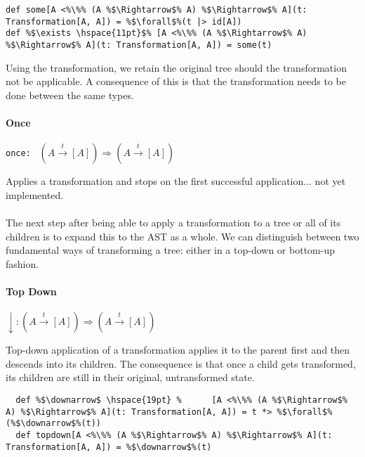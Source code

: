 \documentclass[10pt,a4paper,oneside]{scrreprt}
\begin{document}
\begin{lstlisting}
def some[A <%\%% (A %$\Rightarrow$% A) %$\Rightarrow$% A](t: Transformation[A, A]) = %$\forall$%(t |> id[A])
def %$\exists \hspace{11pt}$% [A <%\%% (A %$\Rightarrow$% A) %$\Rightarrow$% A](t: Transformation[A, A]) = some(t)
\end{lstlisting}

Using the  transformation, we retain the original tree should the transformation not be applicable. A consequence of this is that the transformation needs to be done between the same types.

\paragraph{Once} \hfill \lstinline{once: } $(A \overset{t}{\rightarrow} [A]) \Rightarrow (A \overset{t}{\rightarrow} [A])$

\vspace{7pt} Applies a transformation and stops on the first successful application... not yet implemented.
\\\\
The next step after being able to apply a transformation to a tree or all of its children is to expand this to the AST as a whole. We can distinguish between two fundamental ways of transforming a tree: either in a top-down or bottom-up fashion.

\paragraph{Top Down} \hfill $\downarrow: (A \overset{t}{\rightarrow} [A]) \Rightarrow (A \overset{t}{\rightarrow} [A])$

\vspace{7pt} Top-down application of a transformation applies it to the parent first and then descends into its children. The consequence is that once a child gets transformed, its children are still in their original, untransformed state.

\begin{lstlisting}
  def %$\downarrow$ \hspace{19pt} %      [A <%\%% (A %$\Rightarrow$% A) %$\Rightarrow$% A](t: Transformation[A, A]) = t *> %$\forall$%(%$\downarrow$%(t))
  def topdown[A <%\%% (A %$\Rightarrow$% A) %$\Rightarrow$% A](t: Transformation[A, A]) = %$\downarrow$%(t)
\end{lstlisting}
\end{document}
